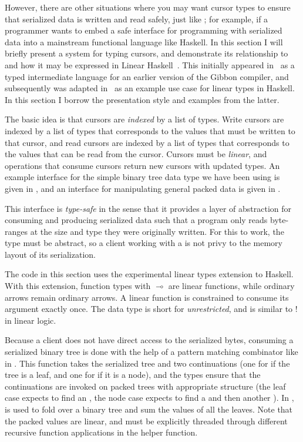 However, there are other situations where you may want cursor types to ensure
that serialized data is written and read safely, just like \ourcalc{}; for
example, if a programmer wants to embed a safe interface for programming with
serialized data into a mainstream functional language like Haskell. In this
section I will briefly present a system for typing cursors, and demonstrate its
relationship to \lamcur{} and how it may be expressed in Linear
Haskell~\cite{linear-haskell}. This initially appeared in~\cite{ecoop17-gibbon}
as a typed intermediate language for an earlier version of the Gibbon compiler,
and subsequently was adapted in~\cite{linear-haskell} as an example use case for
linear types in Haskell. In this section I borrow the presentation style
and examples from the latter.

The basic idea is that cursors are \emph{indexed} by a list of types.
Write cursors are indexed by a list of types that corresponds to the values
that must be written to that cursor, and read cursors are indexed by a list of
types that corresponds to the values that can be read from the cursor.
Cursors must be \emph{linear}, and operations that consume cursors return
new cursors with updated types. An example interface for the simple
binary tree data type we have been using is given in ,
and an interface for manipulating general packed data is given in
.

This interface is \emph{type-safe} in the sense that it provides a layer
of abstraction for consuming and producing serialized data such that
a program only reads byte-ranges at the size and type they were originally
written. For this to work, the  type must be abstract, so
a client working with a  is not privy to the memory
layout of its serialization.

The code in this section uses the experimental linear types extension to
Haskell. With this extension, function types with $\multimap$ are linear
functions, while ordinary arrows remain ordinary arrows. A linear function
is constrained to consume its argument exactly once. The  data type
is short for \emph{unrestricted}, and is similar to $!$ in linear logic.

Because a client does not have direct access to the serialized bytes,
consuming a serialized binary tree is done with the help of a pattern
matching combinator like  in . This
function takes the serialized tree and two continuations (one for if the
tree is a leaf, and one for if it is a node), and the types ensure that
the continuations are invoked on packed trees with appropriate structure
(the leaf case expects to find an , the node case expects to
find a  and then another ).
%
In ,  is used to fold over a binary
tree and sum the values of all the leaves. Note that the packed values are linear,
and must be explicitly threaded through different recursive function applications
in the  helper function.

